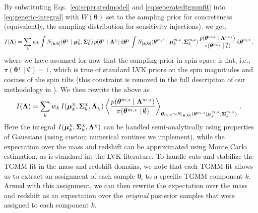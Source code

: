 \documentclass[twocolumn,usenames,dvipsnames,linenumbers]{aastex631}
\begin{document}
By substituting Eqs.~\eqref{eq:seperatedmodel} and \eqref{eq:seperatedtgmmfit} into \eqref{eq:generic-integral} with $W(\boldsymbol{\theta})$ set to the sampling prior for concreteness (equivalently, the sampling distribution for sensitivity injections), we get,
\begin{equation}
	I(\boldsymbol{\Lambda}) = \sum_k w_k
\int N_{[{\bf a},{\bf b}]}(\boldsymbol{\theta}^\chi\mid \boldsymbol{\mu}^{\chi}_k, {\bf \Sigma}^{\chi}_k)\, p(\boldsymbol{\theta}^\chi \mid \boldsymbol{\Lambda}^\chi)\, \mathrm{d}\boldsymbol{\theta}^\chi 
\int N_{[{\bf a},{\bf b}]}(\boldsymbol{\theta}^{m,z} \mid \boldsymbol{\mu}^{m,z}_k, {\bf \Sigma}^{m,z}_k)\, \frac{p(\boldsymbol{\theta}^{m,z} \mid \boldsymbol{\Lambda}^{m,z})}{\pi(\boldsymbol{\theta}^{m,z} \mid \emptyset)}\,  \mathrm{d}\boldsymbol{\theta}^{m,z} \,,
	\label{eq:seperatedintegral-0}
\end{equation}
where we have assumed for now that the sampling prior in spin space is flat, i.e., $\pi(\boldsymbol{\theta}^\chi \mid \emptyset) = 1$,
which is true of standard \ac{LVK} priors on the spin magnitudes and cosines of the spin tilts (this constraint is removed in the full description of our methodology in \citealt{TGMM_Methods}). 
We then rewrite the above as
\begin{equation}
		I(\boldsymbol{\Lambda}) = \sum_k w_k\,
		I(\boldsymbol{\mu}^{\chi}_k, {\bf \Sigma}^{\chi}_k, \boldsymbol{\Lambda}_\chi)
	\left\langle \frac{p(\boldsymbol{\theta}^{m,z} \mid \boldsymbol{\Lambda}^{m,z})}{\pi(\boldsymbol{\theta}^{m,z} \mid \emptyset)}\right\rangle_{\boldsymbol{\theta}_{m,z} \sim N_{[{\bf a},{\bf b}]}(\boldsymbol{\theta}^{m,z} \mid \boldsymbol{\mu}^{m,z}_k, {\bf \Sigma}^{m,z}_k)} \,.
		\label{eq:seperatedintegral-1}
\end{equation}
Here the integral $I(\boldsymbol{\mu}^{\chi}_k, {\bf \Sigma}^{\chi}_k, \boldsymbol{\Lambda}^\chi)$ can be handled semi-analytically using properties of Gaussians (using custom numerical routines we implement), while the expectation over the mass and redshift can be approximated using Monte Carlo estimation, as is standard int the \ac{LVK} literature. 
To handle cuts and stabilize the \ac{TGMM} fit in the mass and redshift domains, we note that each \ac{TGMM} fit allows us to extract an assignment of each sample $\boldsymbol{\theta}_i$ to a specific \ac{TGMM} component $k$. 
Armed with this assignment, we can then rewrite the expectation over the mass and redshift as an expectation over the \textit{original} posterior samples that were assigned to each component $k$.
\end{document}
